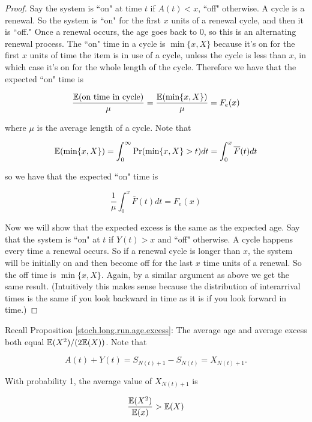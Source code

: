\begin{proof} Say the system is ``on" at time \(t\) if \(A(t) < x\), ``off" otherwise. A cycle is a renewal. So the system is ``on" for the first \(x\) units of a renewal cycle, and then it is ``off." Once a renewal occurs, the age goes back to 0, so this is an alternating renewal process. The ``on" time in a cycle is \(\min \{x, X\}\) because it's on for the first \(x\) units of time the item is in use of a cycle, unless the cycle is less than \(x\), in which case it's on for the whole length of the cycle. Therefore we have that the expected ``on" time is

\[
\frac{\mathbb{E}( \text{on time in cycle})}{\mu} = \frac{\mathbb{E}(\min \{x, X\})}{\mu} = F_e(x)
\]

where \(\mu\) is the average length of a cycle. Note that

\[
\mathbb{E}(\min \{x, X\}) = \int_0^\infty \Pr( \min \{x, X\} > t) dt = \int_0^x \overline{F}(t) dt
\]

so we have that the expected ``on" time is

\[
\frac{1}{\mu}  \int_0^x \overline{F}(t) dt = F_e(x)
\]

Now we will show that the expected excess is the same as the expected age. Say that the system is ``on" at \(t\) if \(Y(t) > x\) and ``off" otherwise. A cycle happens every time a renewal occurs. So if a renewal cycle is longer than \(x\), the system will be initially on and then become off for the last \(x\) time units of a renewal. So the off time is \(\min \{x, X\} \). Again, by a similar argument as above we get the same result. (Intuitively this makes sense because the distribution of interarrival times is the same if you look backward in time as it is if you look forward in time.)


\end{proof}

Recall Proposition \ref{stoch.long.run.age.excess}: The average age and average excess both equal \(\mathbb{E}(X^2)/(2 \mathbb{E}(X))\).  Note that

\[
A(t) + Y(t) = S_{N(t) + 1} - S_{N(t)} = X_{N(t)+ 1}.
\]

\begin{proposition}[[\textbf{Proposition 3.4.6 in \textit{Stochastic Processes}}] With probability 1, the average value of \(X_{N(t) + 1}\) is 

\[
\frac{\mathbb{E}(X^2)}{\mathbb{E}(x)} > \mathbb{E}(X)
\]

\end{proposition}

